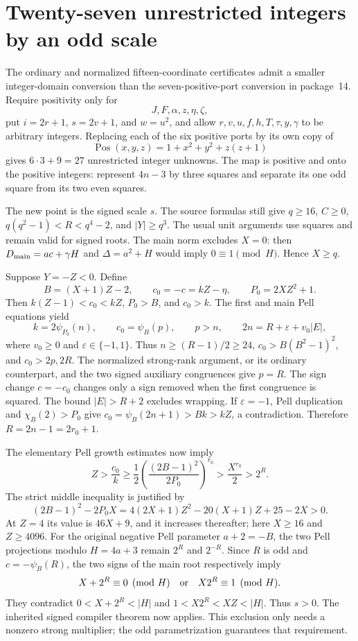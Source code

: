 \section{Twenty-seven unrestricted integers by an odd scale}
\label{sec:integer27}\label{sec:integer}

The ordinary and normalized fifteen-coordinate certificates admit a
smaller integer-domain conversion than the seven-positive-port conversion
in package~14. Require positivity only for
\[
 J,F,\alpha,z,\eta,\zeta,
\]
put $i=2r+1$, $s=2v+1$, and $w=u^2$, and allow
$r,v,u,f,h,T,\tau,y,\gamma$ to be arbitrary integers. Replacing each of
the six positive ports by its own copy of
\[
 \operatorname{Pos}(x,y,z)=1+x^2+y^2+z(z+1)
\]
gives $6\cdot3+9=27$ unrestricted integer unknowns. The map is positive
and onto the positive integers: represent $4n-3$ by three squares and
separate its one odd square from its two even squares.

The new point is the signed scale $s$. The source formulas still give
$q\ge16$, $C\ge0$, $q(q^2-1)<R<q^4-2$, and $|Y|\ge q^3$.
The usual unit arguments use squares and remain valid for signed roots.
The main norm excludes $X=0$: then $D_{\rm main}=ac+\gamma H$ and
$\Delta=a^2+H$ would imply $0\equiv1\pmod H$. Hence $X\ge q$.

Suppose $Y=-Z<0$. Define
\[
 B=(X+1)Z-2,\qquad c_0=-c=kZ-\eta,\qquad P_0=2XZ^2+1.
\]
Then $k(Z-1)<c_0<kZ$, $P_0>B$, and $c_0>k$. The first and main
Pell equations yield
\[
 k=2\psi_{P_0}(n),\qquad c_0=\psi_B(p),\qquad p>n,
 \qquad 2n=R+\varepsilon+v_0|E|,
\]
where $v_0\ge0$ and $\varepsilon\in\{-1,1\}$. Thus
$n\ge(R-1)/2\ge24$, $c_0>B(B^2-1)^2$, and $c_0>2p,2R$.
The normalized strong-rank argument, or its ordinary counterpart, and
the two signed auxiliary congruences give $p=R$. The sign change
$c=-c_0$ changes only a sign removed when the first congruence is squared.
The bound $|E|>R+2$ excludes wrapping. If $\varepsilon=-1$, Pell
duplication and $\chi_B(2)>P_0$ give
$c_0=\psi_B(2n+1)>Bk>kZ$, a contradiction. Therefore
$R=2n-1=2r_0+1$.

The elementary Pell growth estimates now imply
\[
 Z>\frac{c_0}{k}\ge
 \frac12\left(\frac{(2B-1)^2}{2P_0}\right)^{r_0}
 >\frac{X^{r_0}}2>2^R.
\]
The strict middle inequality is justified by
\[
 (2B-1)^2-2P_0X
 =4(2X+1)Z^2-20(X+1)Z+25-2X>0.
\]
At $Z=4$ its value is $46X+9$, and it increases thereafter; here
$X\ge16$ and $Z\ge4096$.
For the original negative Pell parameter $a+2=-B$, the two Pell projections
modulo $H=4a+3$ remain $2^R$ and $2^{-R}$. Since $R$ is odd and
$c=-\psi_B(R)$, the two signs of the main root respectively imply
\[
 X+2^R\equiv0\pmod H
 \quad\hbox{or}\quad
 X2^R\equiv1\pmod H.
\]
They contradict $0<X+2^R<|H|$ and $1<X2^R<XZ<|H|$. Thus $s>0$.
The inherited signed compiler theorem now applies. This exclusion only
needs a nonzero strong multiplier; the odd parametrization guarantees
that requirement.

